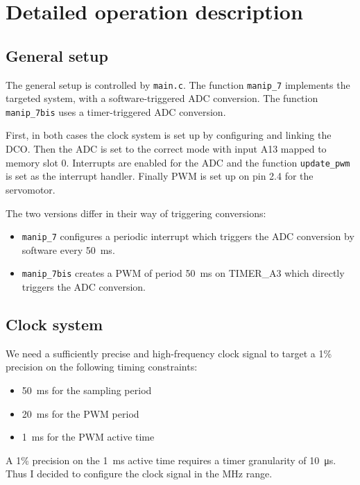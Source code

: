 \documentclass[12pt,a4paper]{article}
\begin{document}
\section{Detailed operation description}

\subsection{General setup}
The general setup is controlled by \texttt{main.c}. The function \texttt{manip\_7} implements the targeted system, with a software-triggered ADC conversion. The function \texttt{manip\_7bis} uses a timer-triggered ADC conversion.

First, in both cases the clock system is set up by configuring and linking the DCO. Then the ADC is set to the correct mode with input A13 mapped to memory slot 0. Interrupts are enabled for the ADC and the function \texttt{update\_pwm} is set as the interrupt handler. Finally PWM is set up on pin 2.4 for the servomotor.

The two versions differ in their way of triggering conversions:
\begin{itemize}
\item \texttt{manip\_7} configures a periodic interrupt which triggers the ADC conversion by software every \SI{50}{\milli\s}.
\item \texttt{manip\_7bis} creates a PWM of period \SI{50}{\milli\s} on TIMER\_A3 which directly triggers the ADC conversion.
\end{itemize}




\subsection{Clock system}

We need a sufficiently precise and high-frequency clock signal to target a 1\% precision on the following timing constraints:
\begin{itemize}[nosep]
\item \SI{50}{\milli\s} for the sampling period
\item \SI{20}{\milli\s} for the PWM period
\item \SI{1}{\milli\s} for the PWM active time
\end{itemize}

A 1\% precision on the \SI{1}{\milli\s} active time requires a timer granularity of \SI{10}{\micro\s}. Thus I decided to configure the clock signal in the \si{\mega\hertz} range.
\end{document}
